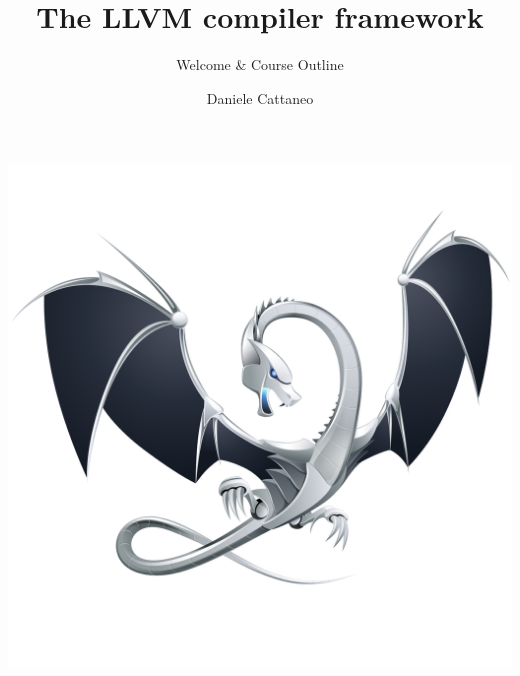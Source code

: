 

\author{Daniele Cattaneo}
\date{\DATE}
\title{The LLVM compiler framework}
\subtitle{Welcome \& Course Outline}
\newcommand{\customdata}{Daniele Cattaneo <daniele.cattaneo@polimi.it>}






\begin{frame}
\maketitle
\end{frame}


\begin{frame}[plain]{}
  \begin{center}
    \vspace{-.05\textheight}
    \includegraphics[width=\textwidth]{img/logo.pdf}
  \end{center}
\end{frame}


